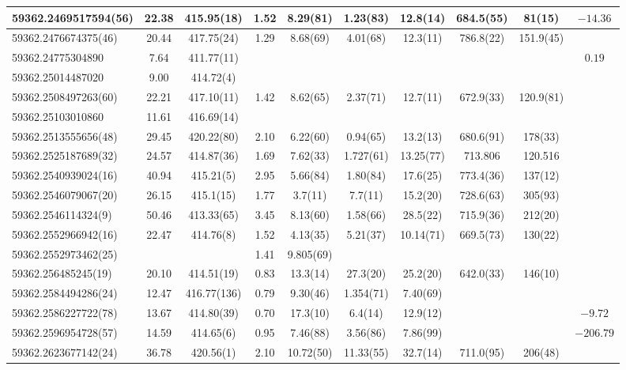 \documentclass[preprint2, trackchanges]{aastex631}
\begin{document}
{{\begin{longtable}{lccccccccc}
\hline
59362.2469517594(56) & 22.38 & 415.95(18) & 1.52 & 8.29(81) & 1.23(83)  & 12.8(14) & 684.5(55) & 81(15) & $-14.36$ \\
\hline
59362.2476674375(46) & 20.44 & 417.75(24) & 1.29 & 8.68(69) & 4.01(68)  & 12.3(11) & 786.8(22) & 151.9(45) &  \\
\hline
59362.24775304890 & 7.64 & 411.77(11) &  &  &  &    &  &  & $0.19$ \\
\hline
59362.25014487020 & 9.00 & 414.72(4) &  &  &  &    &  &  &  \\
\hline
59362.2508497263(60) & 22.21 & 417.10(11) & 1.42 & 8.62(65) & 2.37(71)  & 12.7(11) & 672.9(33) & 120.9(81) &  \\
\hline
59362.25103010860 & 11.61 & 416.69(14) &  &  &    &  &  &  &  \\
\hline
59362.2513555656(48) & 29.45 & 420.22(80) & 2.10 & 6.22(60) & 0.94(65)  & 13.2(13) & 680.6(91) & 178(33) &  \\
\hline
59362.2525187689(32) & 24.57 & 414.87(36) & 1.69 & 7.62(33) & 1.727(61)  & 13.25(77) & 713.806 & 120.516 &  \\
\hline
59362.2540939024(16) & 40.94 & 415.21(5) & 2.95 & 5.66(84) & 1.80(84)  & 17.6(25) & 773.4(36) & 137(12) &  \\
\hline
59362.2546079067(20) & 26.15 & 415.1(15) & 1.77 & 3.7(11) & 7.7(11)  & 15.2(20) & 728.6(63) & 305(93) &  \\
\hline
59362.2546114324(9) & 50.46 & 413.33(65) & 3.45 & 8.13(60) & 1.58(66) & 28.5(22) & 715.9(36) & 212(20) &  \\
\hline
59362.2552966942(16) & 22.47 & 414.76(8) & 1.52 & 4.13(35) & 5.21(37)  & 10.14(71) & 669.5(73) & 130(22) &  \\
59362.2552973462(25)  &  & & 1.41 & 9.805(69) &  &   &  &  &  \\
\hline
59362.256485245(19) & 20.10 & 414.51(19) & 0.83 & 13.3(14) & 27.3(20)  & 25.2(20) & 642.0(33) & 146(10) &  \\
\hline
59362.2584494286(24) & 12.47 & 416.77(136) & 0.79 & 9.30(46) & 1.354(71)  & 7.40(69) &  &  &  \\
\hline
59362.2586227722(78) & 13.67 & 414.80(39) & 0.70 & 17.3(10) & 6.4(14)  & 12.9(12) &  &  & $-9.72$ \\
\hline
59362.2596954728(57) & 14.59 & 414.65(6) & 0.95 & 7.46(88) & 3.56(86)  & 7.86(99) &  &  & $-206.79$ \\
\hline
59362.2623677142(24) & 36.78 & 420.56(1) & 2.10 & 10.72(50) & 11.33(55)  & 32.7(14) & 711.0(95) & 206(48) &  \\

\end{longtable}}}
\end{document}
